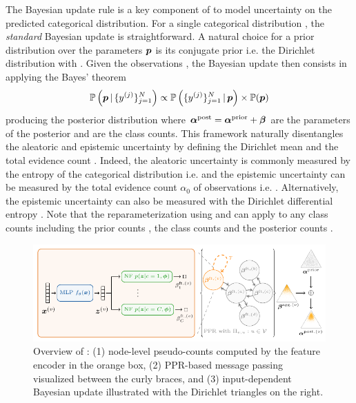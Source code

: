 The Bayesian update rule is a key component of \GPNacro{} to model uncertainty on the predicted categorical distribution. For a single categorical distribution \smash{$\y \sim \DCat(\p)$}, the \emph{standard} Bayesian update is straightforward. A natural choice for a prior distribution over the parameters $\bm{p}$ is its conjugate prior i.e. the Dirichlet distribution  with . Given the observations , the Bayesian update then consists in applying the Bayes' theorem 
\begin{align}
    \operatorname{\mathbb{P}}\left( \bm{p} \,|\, \{ y
^{(j)}\}_{j=1}^N \right) \propto \operatorname{\mathbb{P}}\left(\{ y^{(j)}  \}_{j=1}^N \,|\, \bm{p} \right) \times \operatorname{\mathbb{P}}(\bm{p})
\end{align} producing the posterior distribution  where $\bm{\alpha}^\text{post} = \bm{\alpha}^\text{prior} + \bm{\beta}$ are the parameters of the posterior and  are the class counts. This framework naturally disentangles the aleatoric and epistemic uncertainty by defining the Dirichlet mean  and the total evidence count . Indeed, the aleatoric uncertainty is commonly measured by the entropy of the categorical distribution i.e.  \cite{Malinin2017, charpentier2020, NatPN2021} and the epistemic uncertainty can be measured by the total evidence count $\alpha_0$ of observations i.e.  \cite{charpentier2020, NatPN2021}. Alternatively, the epistemic uncertainty can also be measured with the Dirichlet differential entropy \cite{Malinin2017}. Note that the reparameterization using \smash{$\bar{\p}$} and  can apply to any class counts including the prior counts , the class counts \smash{$\vbeta$} and the posterior counts .

\begin{figure}
    \centering
	\includegraphics[width=.75\textwidth]{sections/009_neurips2021/resources/model.pdf}
	\caption{Overview of \GPN{}: (1) node-level pseudo-counts computed by the feature encoder in the orange box, (2) PPR-based message passing visualized between the curly braces, and (3) input-dependent Bayesian update illustrated with the Dirichlet triangles on the right.}
    \label{fig:model_vis}
    \vspace{-3mm}
\end{figure}

